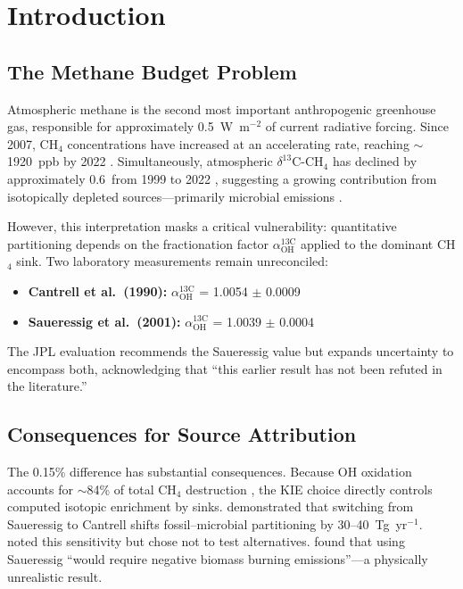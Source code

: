 \documentclass[11pt,twocolumn]{article}
\begin{document}
\section{Introduction}

\subsection{The Methane Budget Problem}

Atmospheric methane is the second most important anthropogenic greenhouse gas, responsible for approximately 0.5~W~m$^{-2}$ of current radiative forcing. Since 2007, CH$_4$ concentrations have increased at an accelerating rate, reaching $\sim$1920~ppb by 2022 \citep{Nisbet2019}. Simultaneously, atmospheric $\delta^{13}$C-CH$_4$ has declined by approximately 0.6\permil\ from 1999 to 2022 \citep{Lan2021,RiddellYoung2025}, suggesting a growing contribution from isotopically depleted sources---primarily microbial emissions \citep{Schwietzke2016,Basu2022,He2026Science}.

However, this interpretation masks a critical vulnerability: quantitative partitioning depends on the fractionation factor $\alpha_{\mathrm{OH}}^{13\mathrm{C}}$ applied to the dominant CH$_4$ sink. Two laboratory measurements remain unreconciled:
\begin{itemize}
\item \textbf{Cantrell et al.\ (1990):} $\alpha_{\mathrm{OH}}^{13\mathrm{C}}$ = 1.0054 $\pm$ 0.0009
\item \textbf{Saueressig et al.\ (2001):} $\alpha_{\mathrm{OH}}^{13\mathrm{C}}$ = 1.0039 $\pm$ 0.0004
\end{itemize}

The JPL evaluation \citep{Burkholder2019} recommends the Saueressig value but expands uncertainty to encompass both, acknowledging that ``this earlier result has not been refuted in the literature.''

\subsection{Consequences for Source Attribution}

The 0.15\% difference has substantial consequences. Because OH oxidation accounts for $\sim$84\% of total CH$_4$ destruction \citep{Saunois2020}, the KIE choice directly controls computed isotopic enrichment by sinks. \citet{Basu2022} demonstrated that switching from Saueressig to Cantrell shifts fossil--microbial partitioning by 30--40~Tg~yr$^{-1}$. \citet{Thanwerdas2024} noted this sensitivity but chose not to test alternatives. \citet{He2026JGR} found that using Saueressig ``would require negative biomass burning emissions''---a physically unrealistic result.
\end{document}
